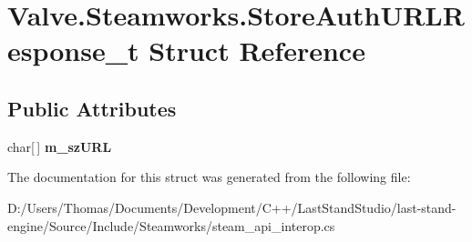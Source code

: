 \hypertarget{structValve_1_1Steamworks_1_1StoreAuthURLResponse__t}{}\section{Valve.\+Steamworks.\+Store\+Auth\+U\+R\+L\+Response\+\_\+t Struct Reference}
\label{structValve_1_1Steamworks_1_1StoreAuthURLResponse__t}
\subsection*{Public Attributes}
\begin{DoxyCompactItemize}
\item 
\hypertarget{structValve_1_1Steamworks_1_1StoreAuthURLResponse__t_a60fb800947f517d7e8c93ac258a098b9}{}char\mbox{[}$\,$\mbox{]} {\bfseries m\+\_\+sz\+U\+R\+L}\label{structValve_1_1Steamworks_1_1StoreAuthURLResponse__t_a60fb800947f517d7e8c93ac258a098b9}

\end{DoxyCompactItemize}


The documentation for this struct was generated from the following file\+:\begin{DoxyCompactItemize}
\item 
D\+:/\+Users/\+Thomas/\+Documents/\+Development/\+C++/\+Last\+Stand\+Studio/last-\/stand-\/engine/\+Source/\+Include/\+Steamworks/steam\+\_\+api\+\_\+interop.\+cs\end{DoxyCompactItemize}

